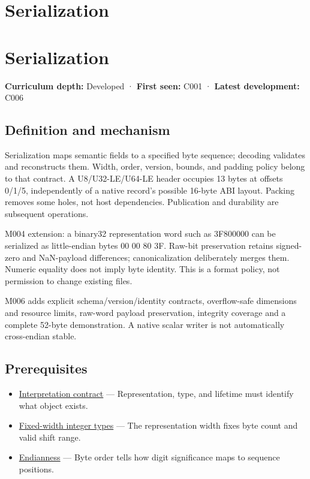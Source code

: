 \hypertarget{appendix-91d09ebed979}{}
\section*{Serialization}
\section{Serialization}\label{appendix-91d09ebed979-serialization}

\textbf{Curriculum depth:} Developed · \textbf{First seen:} C001 · \textbf{Latest development:} C006

\subsection{Definition and mechanism}\label{appendix-91d09ebed979-definition-and-mechanism}

Serialization maps semantic fields to a specified byte sequence; decoding validates and reconstructs them. Width, order, version, bounds, and padding policy belong to that contract. A U8/U32-LE/U64-LE header occupies 13 bytes at offsets 0/1/5, independently of a native record's possible 16-byte ABI layout. Packing removes some holes, not host dependencies. Publication and durability are subsequent operations.

M004 extension: a binary32 representation word such as 3F800000 can be serialized as little-endian bytes 00 00 80 3F. Raw-bit preservation retains signed-zero and NaN-payload differences; canonicalization deliberately merges them. Numeric equality does not imply byte identity. This is a format policy, not permission to change existing files.

M006 adds explicit schema/version/identity contracts, overflow-safe dimensions and resource limits, raw-word payload preservation, integrity coverage and a complete 52-byte demonstration. A native scalar writer is not automatically cross-endian stable.

\subsection{Prerequisites}\label{appendix-91d09ebed979-prerequisites}

\begin{itemize}
\tightlist
\item
  \hyperref[appendix-f414bd4ed05c]{Interpretation contract} --- Representation, type, and lifetime must identify what object exists.
\item
  \hyperref[appendix-cc04044b5782]{Fixed-width integer types} --- The representation width fixes byte count and valid shift range.
\item
  \hyperref[appendix-bc07c3d25b18]{Endianness} --- Byte order tells how digit significance maps to sequence positions.
\end{itemize}

